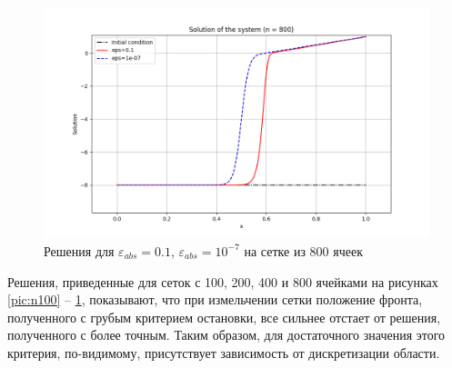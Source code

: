\documentclass[a4paper,12pt]{article}
\begin{document}
\begin{figure}[ht] \centering
	\includegraphics[width=\textwidth]{n800}
	\caption{Решения для $\varepsilon_{abs} = 0.1$, $\varepsilon_{abs} = 10^{-7}$ на сетке из 800 ячеек\label{pic:n800}}
\end{figure}

Решения, приведенные для сеток с 100, 200, 400 и 800 ячейками на рисунках \ref{pic:n100} -- \ref{pic:n800}, показывают, что при измельчении сетки положение фронта, полученного с грубым критерием остановки, все сильнее отстает от решения, полученного с более точным. Таким образом, для достаточного значения этого критерия, по-видимому, присутствует зависимость от дискретизации области.

\end{document}
